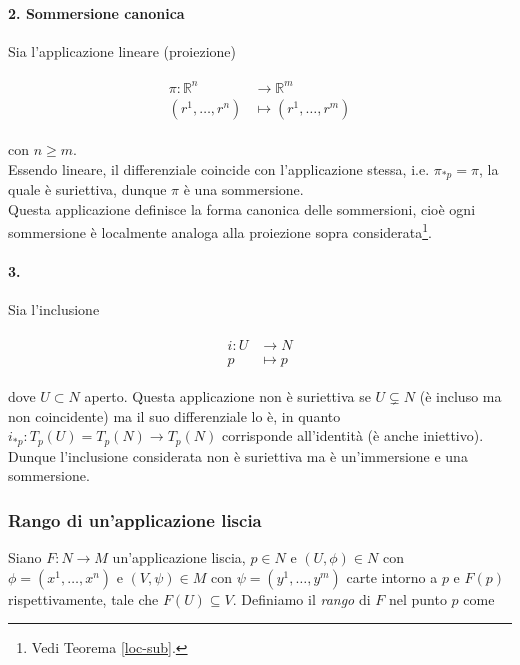 \paragraph{2. Sommersione canonica}

Sia l'applicazione lineare (proiezione)

\begin{align}
	\begin{split}
		\pi : \mathbb{R}^{n} &\to \mathbb{R}^{m}\\
		(r^{1},\dots,r^{n}) &\mapsto (r^{1},\dots,r^{m})
	\end{split}
\end{align}

con $ n \geqslant m $.\\
Essendo lineare, il differenziale coincide con l'applicazione stessa, i.e. $ \pi_{*p} = \pi $, la quale è suriettiva, dunque $ \pi $ è una sommersione.\\
Questa applicazione definisce la forma canonica delle sommersioni, cioè ogni sommersione è localmente analoga alla proiezione sopra considerata\footnote{%
	Vedi Teorema \ref{loc-sub}.%
}.

\paragraph{3.}

Sia l'inclusione

\begin{align}
	\begin{split}
		i : U &\to N\\
		p &\mapsto p
	\end{split}
\end{align}

dove $ U \subset N $ aperto. Questa applicazione non è suriettiva se $ U \subsetneq N $ (è incluso ma non coincidente) ma il suo differenziale lo è, in quanto $ i_{*p} : T_{p}(U) = T_{p}(N) \to T_{p}(N) $ corrisponde all'identità (è anche iniettivo).\\
Dunque l'inclusione considerata non è suriettiva ma è un'immersione e una sommersione.

\subsubsection{Rango di un'applicazione liscia}

Siano $ F : N \to M $ un'applicazione liscia, $ p \in N $ e $ (U,\phi) \in N $ con $ \phi = (x^{1},\dots,x^{n}) $ e $ (V,\psi) \in M $ con $ \psi = (y^{1},\dots,y^{m}) $ carte intorno a $ p $ e $ F(p) $ rispettivamente, tale che $ F(U) \subseteq V $. Definiamo il \textit{rango} di $ F $ nel punto $ p $ come

